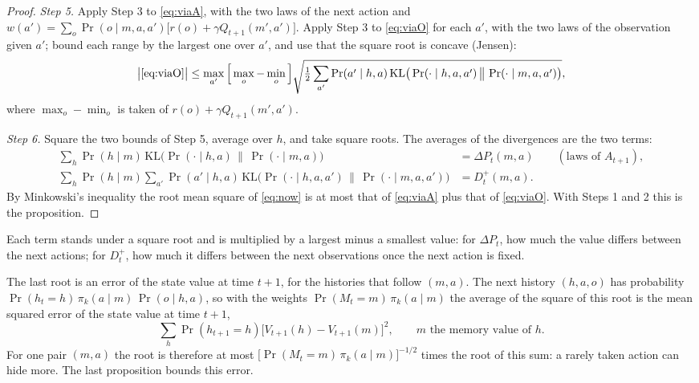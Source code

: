 \documentclass[11pt]{article}
\theoremstyle{definition}
\newcommand{\KL}{\mathrm{KL}}
\newcommand{\dP}{\Delta P}
\begin{document}
\begin{proof}
\emph{Step 5.} Apply Step 3 to \eqref{eq:viaA}, with the two laws of the next action and $w(a')=\sum_o\Pr(o\mid m,a,a')\big[r(o)+\gamma Q_{t+1}(m',a')\big]$. Apply Step 3 to \eqref{eq:viaO} for each $a'$, with the two laws of the observation given $a'$; bound each range by the largest one over $a'$, and use that the square root is concave (Jensen):
\[
\big|\eqref{eq:viaO}\big|\le\max_{a'}\Big[\max_o-\min_o\Big]\sqrt{\tfrac12\sum_{a'}\Pr(a'\mid h,a)\,\KL\big(\Pr(\cdot\mid h,a,a')\,\big\|\,\Pr(\cdot\mid m,a,a')\big)},
\]
where $\max_o-\min_o$ is taken of $r(o)+\gamma Q_{t+1}(m',a')$.

\emph{Step 6.} Square the two bounds of Step 5, average over $h$, and take square roots. The averages of the divergences are the two terms:
\begin{align*}
\sum_h\Pr(h\mid m)\,\KL\big(\Pr(\cdot\mid h,a)\,\big\|\,\Pr(\cdot\mid m,a)\big)&=\dP_t(m,a)\qquad(\text{laws of }A_{t+1}),\\
\sum_h\Pr(h\mid m)\sum_{a'}\Pr(a'\mid h,a)\,\KL\big(\Pr(\cdot\mid h,a,a')\,\big\|\,\Pr(\cdot\mid m,a,a')\big)&=D^+_t(m,a).
\end{align*}
By Minkowski's inequality the root mean square of \eqref{eq:now} is at most that of \eqref{eq:viaA} plus that of \eqref{eq:viaO}. With Steps 1 and 2 this is the proposition.
\end{proof}

Each term stands under a square root and is multiplied by a largest minus a smallest value: for $\dP_t$, how much the value differs between the next actions; for $D^+_t$, how much it differs between the next observations once the next action is fixed.

The last root is an error of the state value at time $t+1$, for the histories that follow $(m,a)$. The next history $(h,a,o)$ has probability $\Pr(h_t=h)\,\pi_k(a\mid m)\,\Pr(o\mid h,a)$, so with the weights $\Pr(M_t=m)\,\pi_k(a\mid m)$ the average of the square of this root is the mean squared error of the state value at time $t+1$,
\[
\sum_h\Pr(h_{t+1}=h)\big[V_{t+1}(h)-V_{t+1}(m)\big]^2,\qquad m\text{ the memory value of }h .
\]
For one pair $(m,a)$ the root is therefore at most $\big[\Pr(M_t=m)\,\pi_k(a\mid m)\big]^{-1/2}$ times the root of this sum: a rarely taken action can hide more. The last proposition bounds this error.
\end{document}
